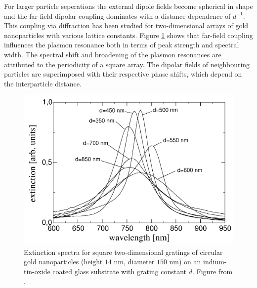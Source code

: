 For larger particle seperations the external dipole fields become spherical in shape and the far-field dipolar coupling dominates with a distance dependence of $d^{-1}$\cite{maier}. This coupling via diffraction has been studied for two-dimensional arrays of gold nanoparticles with various lattice constants\cite{Lamprecht_LSPRfarfieldcoupling}. Figure \ref{fig:farfield_coupling} shows that far-field coupling influences the plasmon resonance both in terms of peak strength and spectral width. The spectral shift and broadening of the plasmon resonances are attributed to the periodicity of a square array. The dipolar fields of neighbouring particles are superimposed with their respective phase shifts, which depend on the interparticle distance\cite{Lamprecht_LSPRfarfieldcoupling}.


\begin{figure}
    \centering
    \includegraphics[width=0.5\linewidth]{figures/Ch2/farfieldcoupling.png}
    \caption{Extinction spectra for square two-dimensional gratings of circular gold nanoparticles (height $14$ nm, diameter $150$ nm) on an indium-tin-oxide coated glass substrate with grating constant $d$. Figure from \cite{Lamprecht_LSPRfarfieldcoupling}.}
    \label{fig:farfield_coupling}
\end{figure}

